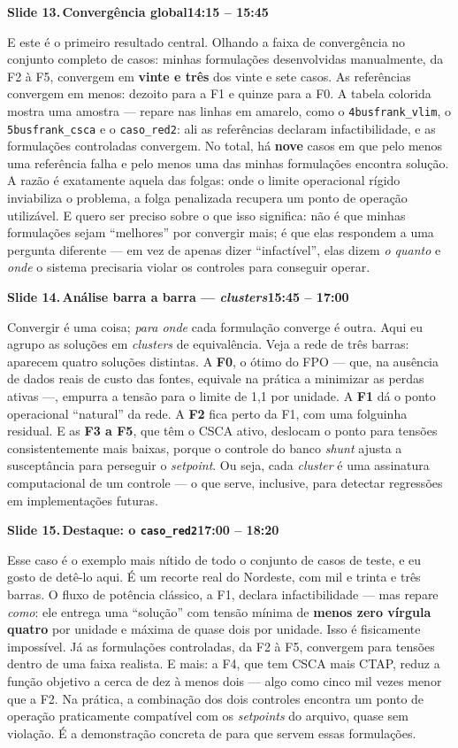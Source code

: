 \documentclass[11pt,a4paper]{article}
\newcommand{\slide}[3]{%
  \bigskip
  \noindent\colorbox{chipbg}{\parbox{\dimexpr\linewidth-2\fboxsep\relax}{%
    \textbf{\textcolor{ufcblue}{#1}}\,\textbf{#2}\hfill\textbf{\textcolor{ufcblue}{#3}}}}\par
  \nopagebreak\medskip
}
\begin{document}
\slide{Slide 13.}{Convergência global}{14:15 -- 15:45}
E este é o primeiro resultado central. Olhando a faixa de convergência no conjunto completo de casos: minhas formulações desenvolvidas manualmente, da F2 à F5, convergem em \textbf{vinte e três} dos vinte e sete casos. As referências convergem em menos: dezoito para a F1 e quinze para a F0. A tabela colorida mostra uma amostra --- repare nas linhas em amarelo, como o \texttt{4busfrank\_vlim}, o \texttt{5busfrank\_csca} e o \texttt{caso\_red2}: ali as referências declaram infactibilidade, e as formulações controladas convergem. No total, há \textbf{nove} casos em que pelo menos uma referência falha e pelo menos uma das minhas formulações encontra solução. A razão é exatamente aquela das folgas: onde o limite operacional rígido inviabiliza o problema, a folga penalizada recupera um ponto de operação utilizável. E quero ser preciso sobre o que isso significa: não é que minhas formulações sejam ``melhores'' por convergir mais; é que elas respondem a uma pergunta diferente --- em vez de apenas dizer ``infactível'', elas dizem \emph{o quanto} e \emph{onde} o sistema precisaria violar os controles para conseguir operar.

\slide{Slide 14.}{Análise barra a barra --- \textit{clusters}}{15:45 -- 17:00}
Convergir é uma coisa; \emph{para onde} cada formulação converge é outra. Aqui eu agrupo as soluções em \textit{clusters} de equivalência. Veja a rede de três barras: aparecem quatro soluções distintas. A \textbf{F0}, o ótimo do FPO --- que, na ausência de dados reais de custo das fontes, equivale na prática a minimizar as perdas ativas ---, empurra a tensão para o limite de 1,1 por unidade. A \textbf{F1} dá o ponto operacional ``natural'' da rede. A \textbf{F2} fica perto da F1, com uma folguinha residual. E as \textbf{F3 a F5}, que têm o CSCA ativo, deslocam o ponto para tensões consistentemente mais baixas, porque o controle do banco \textit{shunt} ajusta a susceptância para perseguir o \textit{setpoint}. Ou seja, cada \textit{cluster} é uma assinatura computacional de um controle --- o que serve, inclusive, para detectar regressões em implementações futuras.

\slide{Slide 15.}{Destaque: o \texttt{caso\_red2}}{17:00 -- 18:20}
Esse caso é o exemplo mais nítido de todo o conjunto de casos de teste, e eu gosto de detê-lo aqui. É um recorte real do Nordeste, com mil e trinta e três barras. O fluxo de potência clássico, a F1, declara infactibilidade --- mas repare \emph{como}: ele entrega uma ``solução'' com tensão mínima de \textbf{menos zero vírgula quatro} por unidade e máxima de quase dois por unidade. Isso é fisicamente impossível. Já as formulações controladas, da F2 à F5, convergem para tensões dentro de uma faixa realista. E mais: a F4, que tem CSCA mais CTAP, reduz a função objetivo a cerca de dez à menos dois --- algo como cinco mil vezes menor que a F2. Na prática, a combinação dos dois controles encontra um ponto de operação praticamente compatível com os \textit{setpoints} do arquivo, quase sem violação. É a demonstração concreta de para que servem essas formulações.
\end{document}
